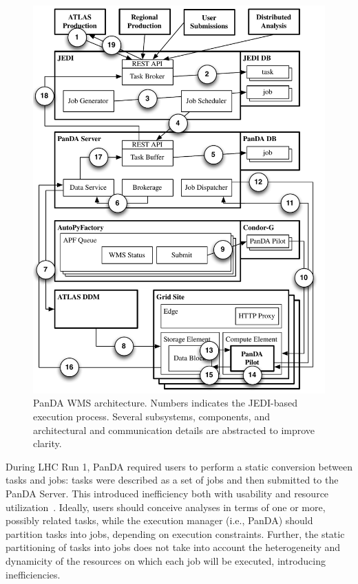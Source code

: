 \documentclass[conference]{IEEEtran}
\begin{document}
\begin{figure}
    \centering
    \includegraphics[width=\columnwidth]{panda_architecture.pdf}
    \caption{PanDA WMS architecture. Numbers indicates the JEDI-based execution
    process. Several subsystems, components, and architectural and
    communication details are abstracted to improve clarity.}
\label{fig:architecture}
\end{figure}

During LHC Run 1, PanDA required users to perform a static conversion between
tasks and jobs: tasks were described as a set of jobs and then submitted to the
PanDA Server. This introduced inefficiency both with usability and resource
utilization~\cite{borodin2015unified}. Ideally, users should conceive analyses
in terms of one or more, possibly related tasks, while the execution manager
(i.e., PanDA) should partition tasks into jobs, depending on execution
constraints. Further, the static partitioning of tasks into jobs does not take
into account the heterogeneity and dynamicity of the resources on which each job
will be executed, introducing inefficiencies.
\end{document}
